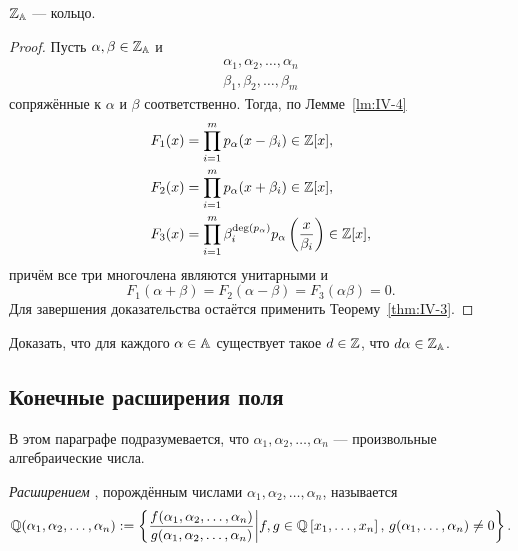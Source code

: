 \begin{ntheorem}
\label{thm:IV-4}
    $\ZZ_\AA$ --- кольцо.
\end{ntheorem}
\begin{proof}
    Пусть $\alpha, \beta \in \ZZ_\AA$ и 
    \begin{align*}
        \alpha_1, \alpha_2, \dots, \alpha_n \\
        \beta_1, \beta_2, \dots, \beta_m
    \end{align*}
    сопряжённые к $\alpha$ и $\beta$ соответственно.
    Тогда, по Лемме~\ref{lm:IV-4}
    \begin{align*}
        F_1(x) &= \prod_{i=1}^{m} p_{\alpha}(x - \beta_i) \in \ZZ[x], \\
        F_2(x) &= \prod_{i=1}^{m} p_{\alpha}(x + \beta_i) \in \ZZ[x], \\
        F_3(x) &= \prod_{i=1}^{m} \beta_i^{\deg{p_{\alpha}}} p_{\alpha}\left( \frac{x}{\beta_i} \right) \in \ZZ[x],
    \end{align*}
    причём все три многочлена являются унитарными и
    \[
        F_1(\alpha + \beta) = F_2(\alpha - \beta) = F_3(\alpha\beta) = 0.
    \]
    Для завершения доказательства остаётся применить Теорему~\ref{thm:IV-3}.
\end{proof}

\begin{nproblem}
\label{prb:IV-1}
    Доказать, что для каждого $\alpha \in \AA$ существует такое $d \in \ZZ$, что $d\alpha \in \ZZ_\AA$.
\end{nproblem}


\subsection{\texorpdfstring{Конечные расширения поля \QQ}{Конечные расширения поля Q}}
\label{subsec:IV-3}

\begin{remark}
    В этом параграфе подразумевается, что $\alpha_1, \alpha_2, \dots, \alpha_n$ --- произвольные алгебраические числа.
\end{remark}

\begin{ndefinition}
\label{def:IV-extension}
    \emph{Расширением} \QQ, порождённым числами $\alpha_1, \alpha_2, \dots, \alpha_n$, называется
    \[
        \QQ(\alpha_1, \alpha_2, \dots, \alpha_n) := 
        \left\{ 
          \frac{f(\alpha_1, \alpha_2, \dots, \alpha_n)}{g(\alpha_1, \alpha_2, \dots, \alpha_n)} 
        \bigg| 
          f, g \in \QQ\left[ x_1, \dots, x_n \right],\, 
          g(\alpha_1, \dots, \alpha_n) \ne 0 
        \right\}.
    \]
\end{ndefinition}

